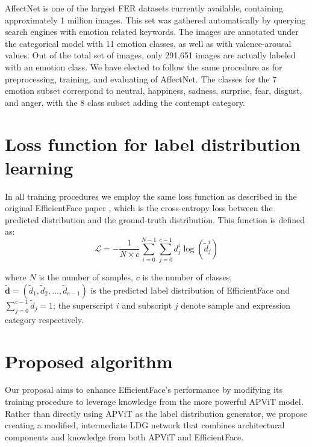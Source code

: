 AffectNet is one of the largest FER datasets currently available, containing approximately 1 million images. This set was gathered automatically by querying search engines with emotion related keywords. The images are annotated under the categorical model with 11 emotion classes, as well as with valence-arousal values. Out of the total set of images, only 291,651 images are actually labeled with an emotion class. We have elected to follow the same procedure as \cite{eff-face2021, apvit2023} for preprocessing, training, and evaluating of AffectNet. The classes for the 7 emotion subset correspond to neutral, happiness, sadness, surprise, fear, disgust, and anger, with the 8 class subset adding the contempt category.

\section{Loss function for label distribution learning}

In all training procedures we employ the same loss function as described in the original EfficientFace paper \cite{eff-face2021}, which is the cross-entropy loss between the predicted distribution and the ground-truth distribution. This function is defined as:\\

\begin{equation}
	\mathcal{L} = -\frac{1}{N \times c} \sum_{i=0}^{N-1} \sum_{j=0}^{c-1} d_j^i \log(\widetilde{d}_j^i)
\end{equation}

where $N$ is the number of samples, $c$ is the number of classes, $\widetilde{\boldsymbol{d}} = (\widetilde{d}_1, \widetilde{d}_2, ..., \widetilde{d}_{c-1})$ is the predicted label distribution of EfficientFace and $\sum_{j=0}^{c-1} \widetilde{d}_j = 1$; the superscript $i$ and subscript $j$ denote sample and expression category respectively.

\section{Proposed algorithm}

Our proposal aims to enhance EfficientFace's performance by modifying its training procedure to leverage knowledge from the more powerful APViT model. Rather than directly using APViT as the label distribution generator, we propose creating a modified, intermediate LDG network that combines architectural components and knowledge from both APViT and EfficientFace.

